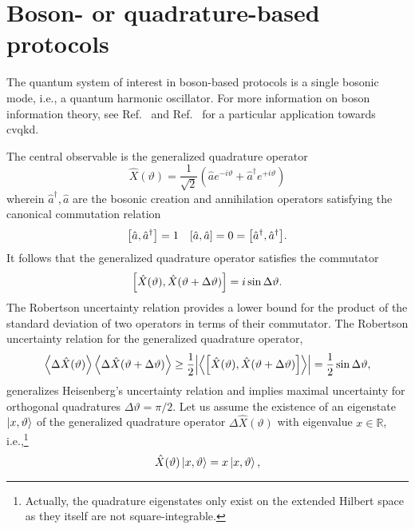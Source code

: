 \section{Boson- or quadrature-based protocols}

The quantum system of interest in boson-based protocols is a single bosonic mode, i.e., a quantum harmonic oscillator.
For more information on boson information theory, see Ref.~\cite{Weedbrook2012,Ferraro2005} and Ref.~\cite{Lodewyck2007,Diamanti2015} for a particular application towards \gls{cvqkd}.

The central observable is the generalized quadrature operator~\cite[p.~36]{Barnett2002}
\begin{equation}
	\hat{X}(\vartheta)
	=
	\frac{1}{\sqrt{2}}
	\left(
		\hat{a}
		e^{-i\vartheta}
		+
		\hat{a}^\dagger
		e^{+i\vartheta}
	\right)
\end{equation}
wherein $\hat{a}^\dagger,\hat{a}$ are the bosonic creation and annihilation operators satisfying the canonical commutation relation
\begin{align}
	\comm{\hat{a}}{\hat{a}^\dagger}
	=
	1
	&&
	\comm{\hat{a}}{\hat{a}}
	=
	0
	=
	\comm{\hat{a}^\dagger}{\hat{a}^\dagger}
	.
\end{align}
It follows that the generalized quadrature operator satisfies the commutator
\begin{equation}
	\comm{\hat{X}(\vartheta)}{\hat{X}(\vartheta+\Delta\vartheta)}
	=
	i\sin\Delta\vartheta
	.
\end{equation}
The Robertson uncertainty relation provides a lower bound for the product of the standard deviation of two operators in terms of their commutator.
The Robertson uncertainty relation for the generalized quadrature operator,
\begin{equation}
	\expval{\Delta\hat{X}(\vartheta)}
	\expval{\Delta\hat{X}(\vartheta+\Delta\vartheta)}
	\geq
	\frac{1}{2}
	\abs{\expval{\comm{\hat{X}(\vartheta)}{\hat{X}(\vartheta+\Delta\vartheta)}}}
	=
	\frac{1}{2}
	\sin\Delta\vartheta
	,
\end{equation}
generalizes Heisenberg's uncertainty relation and implies maximal uncertainty for orthogonal quadratures $\Delta\vartheta=\pi/2$.
Let us assume the existence of an eigenstate $\ket{x,\vartheta}$ of the generalized quadrature operator $\Delta\hat{X}(\vartheta)$ with eigenvalue $x\in\mathbb{R}$, i.e.,\footnote{Actually, the quadrature eigenstates only exist on the extended Hilbert space as they itself are not square-integrable.}
\begin{equation}
	\hat{X}(\vartheta)
	\ket{x,\vartheta}
	=
	x\ket{x,\vartheta}
	,
\end{equation}
